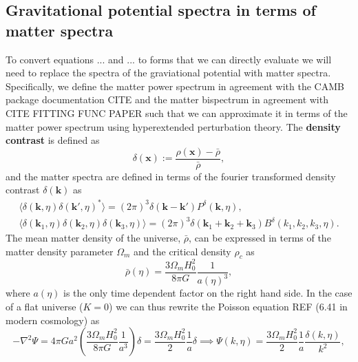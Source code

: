 \documentclass[11pt]{article} %
\newcommand{\br}[1]{\ensuremath{\left( #1 \right)}}
\begin{document}
\subsection{Gravitational potential spectra in terms of matter spectra}
To convert equations ... and ... to forms that we can directly evaluate we will need to replace the spectra of the graviational potential with matter spectra. Specifically, we define the matter power spectrum in agreement with the CAMB package documentation CITE and the matter bispectrum in agreement with CITE FITTING FUNC PAPER such that we can approximate it in terms of the matter power spectrum using hyperextended perturbation theory. The \textbf{density contrast} is defined as
\begin{equation}
    \delta(\mathbf x) := \frac{\rho(\mathbf x)-\bar \rho}{\bar\rho},
\end{equation}
and the matter spectra are defined in terms of the fourier transformed density contrast $\delta(\mathbf k)$ as 
\begin{gather*}
    \langle \delta(\mathbf k, \eta) \delta(\mathbf k', \eta)^* \rangle = (2\pi)^3\delta(\mathbf k - \mathbf k')P^\delta(\mathbf k, \eta),\\
    \langle \delta(\mathbf k_1, \eta) \delta(\mathbf k_2, \eta) \delta(\mathbf k_3, \eta) \rangle = (2\pi)^3\delta(\mathbf k_1 + \mathbf k_2 + \mathbf k_3)B^\delta(k_1, k_2, k_3, \eta).
\end{gather*}
The mean matter density of the universe, \( \bar{\rho} \), can be expressed in terms of the matter density parameter \( \Omega_m \) and the critical density \( \rho_c \) as 
$$
\bar{\rho}(\eta) = \frac{3 \Omega_m H_0^2}{8 \pi G}\frac{1}{a(\eta)^3},
$$
where $a(\eta)$ is the only time dependent factor on the right hand side.
In the case of a flat universe ($K=0$) we can thus rewrite the Poisson equation REF (6.41 in modern cosmology) as
\begin{equation}
    -\nabla^2\Psi = 4\pi G a^2\br{\frac{3\Omega_m H_0^2}{8\pi G}\frac{1}{a^3}}\delta = \frac{3\Omega_m H_0^2}{2} \frac{1}{a}\delta \implies \Psi(k, \eta) = \frac{3\Omega_m H_0^2}{2}\frac{1}{a}\frac{\delta(k, \eta)}{k^2},
\end{equation}
\end{document}
